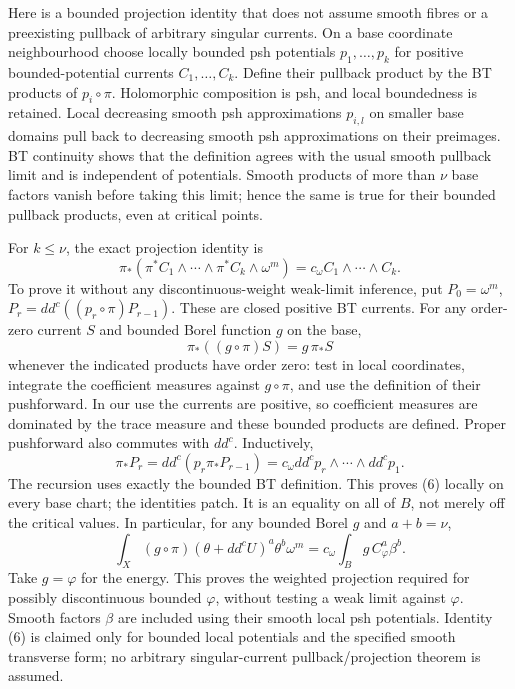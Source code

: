\documentclass[
  11pt,
]{article}
\begin{document}
Here is a bounded projection identity that does not assume smooth fibres
or a preexisting pullback of arbitrary singular currents. On a base
coordinate neighbourhood choose locally bounded psh potentials
\(p_1,\ldots,p_k\) for positive bounded-potential currents
\(C_1,\ldots,C_k\). Define their pullback product by the BT products of
\(p_i\circ\pi\). Holomorphic composition is psh, and local boundedness
is retained. Local decreasing smooth psh approximations \(p_{i,l}\) on
smaller base domains pull back to decreasing smooth psh approximations
on their preimages. BT continuity shows that the definition agrees with
the usual smooth pullback limit and is independent of potentials. Smooth
products of more than \(\nu\) base factors vanish before taking this
limit; hence the same is true for their bounded pullback products, even
at critical points.

For \(k\leq\nu\), the exact projection identity is
\[\pi_*\left(\pi^*C_1\wedge\cdots\wedge\pi^*C_k\wedge\omega^m\right)
=c_\omega C_1\wedge\cdots\wedge C_k. \tag{6}\] To prove it without any
discontinuous-weight weak-limit inference, put \(P_0=\omega^m\),
\(P_r=dd^c((p_r\circ\pi)P_{r-1})\). These are closed positive BT
currents. For any order-zero current \(S\) and bounded Borel function
\(g\) on the base, \[\pi_*((g\circ\pi)S)=g\,\pi_*S\] whenever the
indicated products have order zero: test in local coordinates, integrate
the coefficient measures against \(g\circ\pi\), and use the definition
of their pushforward. In our use the currents are positive, so
coefficient measures are dominated by the trace measure and these
bounded products are defined. Proper pushforward also commutes with
\(dd^c\). Inductively, \[\pi_*P_r=dd^c(p_r\pi_*P_{r-1})
=c_\omega dd^cp_r\wedge\cdots\wedge dd^cp_1.\] The recursion uses
exactly the bounded BT definition. This proves (6) locally on every base
chart; the identities patch. It is an equality on all of \(B\), not
merely off the critical values. In particular, for any bounded Borel
\(g\) and \(a+b=\nu\),
\[\int_X(g\circ\pi)(\theta+dd^cU)^a\theta^b\omega^m
=c_\omega\int_Bg\,C_\varphi^a\beta^b. \tag{7}\] Take \(g=\varphi\) for
the energy. This proves the weighted projection required for possibly
discontinuous bounded \(\varphi\), without testing a weak limit against
\(\varphi\). Smooth factors \(\beta\) are included using their smooth
local psh potentials. Identity (6) is claimed only for bounded local
potentials and the specified smooth transverse form; no arbitrary
singular-current pullback/projection theorem is assumed.
\end{document}
